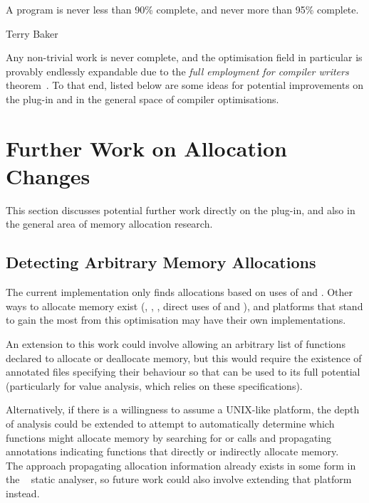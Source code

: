 \epigraph{A program is never less than 90\% complete, and never more than 95\% complete.}{Terry Baker}

Any non-trivial work is never complete, and the optimisation field in particular is provably endlessly expandable due to the \textit{full employment for compiler writers} theorem~\cite{compilerimpl}. To that end, listed below are some ideas for potential improvements on the  plug-in and in the general space of compiler optimisations.

\section{Further Work on Allocation Changes}

This section discusses potential further work directly on the  plug-in, and also in the general area of memory allocation research.

\subsection{Detecting Arbitrary Memory Allocations}

The current implementation only finds allocations based on uses of \malloc{} and \free{}. Other ways to allocate memory exist (, , , direct uses of  and ), and platforms that stand to gain the most from this optimisation may have their own implementations.

An extension to this work could involve allowing an arbitrary list of functions declared to allocate or deallocate memory, but this would require the existence of annotated files specifying their behaviour so that  can be used to its full potential (particularly for value analysis, which relies on these specifications).

Alternatively, if there is a willingness to assume a UNIX-like platform, the depth of analysis could be extended to attempt to automatically determine which functions might allocate memory by searching for  or  calls and propagating annotations indicating functions that directly or indirectly allocate memory.\\
The approach propagating allocation information already exists in some form in the ~\cite{fbinfer} static analyser, so future work could also involve extending that platform instead.

